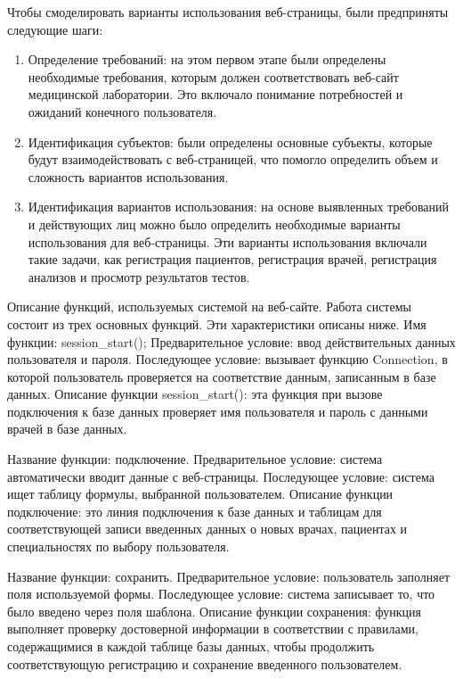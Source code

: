 Чтобы смоделировать варианты использования веб-страницы, были предприняты следующие шаги:

\begin{enumerate}
	\item Определение требований: на этом первом этапе были определены необходимые требования, которым должен соответствовать веб-сайт медицинской лаборатории. Это включало понимание потребностей и ожиданий конечного пользователя.
	\item Идентификация субъектов: были определены основные субъекты, которые будут взаимодействовать с веб-страницей, что помогло определить объем и сложность вариантов использования.
	\item Идентификация вариантов использования: на основе выявленных требований и действующих лиц можно было определить необходимые варианты использования для веб-страницы. Эти варианты использования включали такие задачи, как регистрация пациентов, регистрация врачей, регистрация анализов и просмотр результатов тестов.
\end{enumerate}

Описание функций, используемых системой на веб-сайте.
Работа системы состоит из трех основных функций. Эти характеристики описаны ниже.
Имя функции: session\_start();
Предварительное условие: ввод действительных данных пользователя и пароля.
Последующее условие: вызывает функцию Connection, в которой пользователь проверяется на соответствие данным, записанным в базе данных.
Описание функции session\_start(): эта функция при вызове подключения к базе данных проверяет имя пользователя и пароль с данными врачей в базе данных.

Название функции: подключение.
Предварительное условие: система автоматически вводит данные с веб-страницы.
Последующее условие: система ищет таблицу формулы, выбранной пользователем.
Описание функции подключение: это линия подключения к базе данных и таблицам для соответствующей записи введенных данных о новых врачах, пациентах и специальностях по выбору пользователя.

Название функции: сохранить.
Предварительное условие: пользователь заполняет поля используемой формы.
Последующее условие: система записывает то, что было введено через поля шаблона.
Описание функции сохранения: функция выполняет проверку достоверной информации в соответствии с правилами, содержащимися в каждой таблице базы данных, чтобы продолжить соответствующую регистрацию и сохранение введенного пользователем.